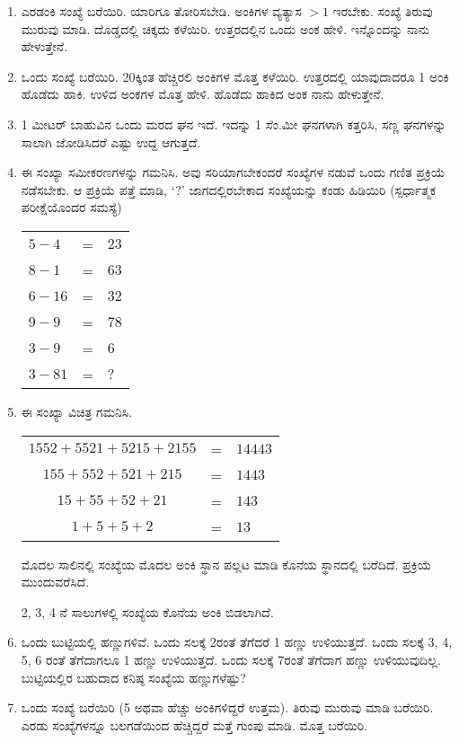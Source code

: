 \begin{enumerate}
\item ಎರಡಂಕಿ ಸಂಖ್ಯೆ ಬರೆಯಿರಿ. ಯಾರಿಗೂ ತೋರಿಸಬೇಡಿ. ಅಂಕಿಗಳ ವ್ಯತ್ಯಾಸ $> 1$ ಇರಬೇಕು. ಸಂಖ್ಯೆ ತಿರುವು ಮುರುವು ಮಾಡಿ. ದೊಡ್ಡದಲ್ಲಿ ಚಿಕ್ಕದು ಕಳೆಯಿರಿ. ಉತ್ತರದಲ್ಲಿನ ಒಂದು ಅಂಕ ಹೇಳಿ. ಇನ್ನೊಂದನ್ನು ನಾನು ಹೇಳುತ್ತೇನೆ. 

\item ಒಂದು ಸಂಖ್ಯೆ ಬರೆಯಿರಿ. 20ಕ್ಕಿಂತ ಹೆಚ್ಚಿರಲಿ ಅಂಕಿಗಳ ಮೊತ್ತ ಕಳೆಯಿರಿ. ಉತ್ತರದಲ್ಲಿ ಯಾವುದಾದರೂ 1 ಅಂಕಿ ಹೊಡೆದು ಹಾಕಿ. ಉಳಿದ ಅಂಕಗಳ ಮೊತ್ತ ಹೇಳಿ. ಹೊಡೆದು ಹಾಕಿದ ಅಂಕ ನಾನು ಹೇಳುತ್ತೇನೆ. 

\item 1 ಮೀಟರ್ ಬಾಹುವಿನ ಒಂದು ಮರದ ಘನ ಇದೆ. ಇದನ್ನು 1 ಸೆಂ.ಮೀ ಘನಗಳಾಗಿ  ಕತ್ತರಿಸಿ, ಸಣ್ಣ ಘನಗಳನ್ನು ಸಾಲಾಗಿ ಜೋಡಿಸಿದರೆ ಎಷ್ಟು ಉದ್ದ ಆಗುತ್ತದೆ. 

\item ಈ ಸಂಖ್ಯಾ ಸಮೀಕರಣಗಳನ್ನು ಗಮನಿಸಿ. ಅವು ಸರಿಯಾಗಬೇಕಂದರೆ ಸಂಖ್ಯೆಗಳ ನಡುವೆ ಒಂದು ಗಣಿತ ಪ್ರಕ್ರಿಯೆ ನಡೆಸಬೇಕು. ಆ ಪ್ರಕ್ರಿಯೆ ಪತ್ತೆ ಮಾಡಿ, `?' ಜಾಗದಲ್ಲಿರಬೇಕಾದ ಸಂಖ್ಯೆಯನ್ನು ಕಂಡು ಹಿಡಿಯಿರಿ (ಸ್ಪರ್ಧಾತ್ಮಕ ಪರೀಕ್ಷೆಯೊಂದರ ಸಮಸ್ಯೆ)

\begin{tabular}[t]{lcl}
$5-4$ & = & $23$\\
$8-1$ & = & $63$\\
$6-16$ & = & $32$\\
$9-9$ & = & $78$\\
$3-9$ & = & $6$\\
$3-81$ & = & $?$
\end{tabular}

\item ಈ ಸಂಖ್ಯಾ ವಿಚಿತ್ರ ಗಮನಿಸಿ. 

\begin{tabular}[t]{ccl}
$1552+5521+5215+2155$ & = & $14443$\\
$155+552+521+215$ & = & $1443$\\
$15+55+52+21$ & = & $143$\\
$1+5+5+2$ & = & $13$ 
\end{tabular}

ಮೊದಲ ಸಾಲಿನಲ್ಲಿ ಸಂಖ್ಯೆಯ ಮೊದಲ ಅಂಕಿ ಸ್ಥಾನ ಪಲ್ಲಟ ಮಾಡಿ ಕೊನೆಯ ಸ್ಥಾನದಲ್ಲಿ ಬರೆದಿದೆ. ಪ್ರಕ್ರಿಯೆ ಮುಂದುವರೆಸಿದೆ. 

2, 3, 4 ನೆ ಸಾಲುಗಳಲ್ಲಿ ಸಂಖ್ಯೆಯ ಕೊನೆಯ ಅಂಕಿ ಬಿಡಲಾಗಿದೆ. 

\item ಒಂದು ಬುಟ್ಟಿಯಲ್ಲಿ ಹಣ್ಣುಗಳಿವೆ. ಒಂದು ಸಲಕ್ಕೆ 2ರಂತೆ ತೆಗೆದರೆ 1 ಹಣ್ಣು ಉಳಿಯುತ್ತದೆ. ಒಂದು ಸಲಕ್ಕೆ 3, 4, 5, 6 ರಂತೆ ತೆಗೆದಾಗಲೂ 1 ಹಣ್ಣು ಉಳಿಯುತ್ತದೆ. ಒಂದು ಸಲಕ್ಕೆ 7ರಂತೆ ತೆಗೆದಾಗ ಹಣ್ಣು ಉಳಿಯುವುದಿಲ್ಲ. ಬುಟ್ಟಿಯಲ್ಲಿರ ಬಹುದಾದ ಕನಿಷ್ಠ ಸಂಖ್ಯೆಯ ಹಣ್ಣುಗಳೆಷ್ಟು? 

\item ಒಂದು ಸಂಖ್ಯೆ ಬರೆಯಿರಿ (5 ಅಥವಾ ಹೆಚ್ಚು ಅಂಕಿಗಳಿದ್ದರೆ ಉತ್ತಮ). ತಿರುವು ಮುರುವು ಮಾಡಿ ಬರೆಯಿರಿ. ಎರಡು ಸಂಖ್ಯೆಗಳನ್ನೂ ಬಲಗಡೆಯಿಂದ ಹೆಚ್ಚಿದ್ದರೆ ಮತ್ತೆ ಗುಂಪು ಮಾಡಿ. ಮೊತ್ತ ಬರೆಯಿರಿ. 


\end{enumerate}
